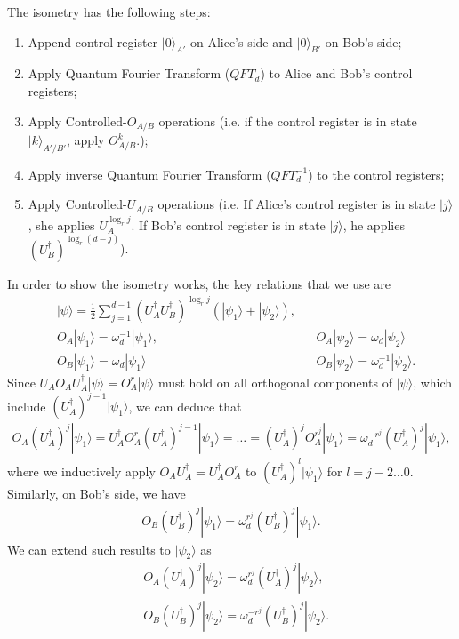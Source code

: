 \documentclass[11pt,letterpaper]{article}
\newcommand{\ket}[1]{|#1\rangle}
\newcommand{\ct}{^{\dagger}}
\newcommand{\1}{\mathbb{1}}
\theoremstyle{definition}
\begin{document}
The isometry has the following steps:
\begin{enumerate}
	\item Append control register $\ket{0}_{A'}$ on Alice's side and $\ket{0}_{B'}$ on Bob's side;
	\item Apply Quantum Fourier Transform ($QFT_d$) to Alice and Bob's control registers;
	\item Apply Controlled-$O_{A/B}$ operations (i.e. if the control register is in state $\ket{k}_{A'/ B'}$, apply
	$O_{A/B}^k$.);
	\item Apply inverse Quantum Fourier Transform ($QFT_d^{-1}$) to the control registers;
	\item Apply Controlled-$U_{A/B}$ operations (i.e. If Alice's control register is in state $\ket{j}$, she applies
	$U_A^{\log_r j}$. If Bob's control register is in state $\ket{j}$, he applies $(U_B\ct)^{\log_r (d-j)}$).
\end{enumerate}
In order to show the isometry works, the key relations that we use are
\begin{align}
	&\ket{\psi} = \frac{1}{2} \sum_{j=1}^{d-1} (U_A\ct U_B\ct)^{\log_r j} (\ket{\psi_1}+\ket{\psi_2}),&&\\
	&O_A \ket{\psi_1} = \omega_d^{-1} \ket{\psi_1},
	&&O_A\ket{\psi_2} = \omega_d \ket{\psi_2} \\
	&O_B\ket{\psi_1} = \omega_d \ket{\psi_1}
	&&O_B\ket{\psi_2} = \omega_d^{-1} \ket{\psi_2}.
\end{align}
Since $U_AO_AU_A\ct \ket{\psi} = O_A^r \ket{\psi}$ must hold on all orthogonal components 
of $\ket{\psi}$, which include $(U_A\ct)^{j-1} \ket{\psi_1}$, we can deduce that
\begin{align}
	O_A (U_A\ct)^j \ket{\psi_1} = U_A\ct O_A^r (U_A\ct)^{j-1} \ket{\psi_1} = \ldots = (U_A\ct)^j O_A^{r^j} \ket{\psi_1}
	= \omega_d^{-r^j} (U_A\ct)^j \ket{\psi_1},
\end{align}
where we inductively apply $O_AU_A\ct = U_A\ct O_A^r$ to $(U_A\ct)^l \ket{\psi_1}$ for $l = j-2 \dots 0$.
Similarly, on Bob's side, we have
\begin{align}
	O_B (U_B\ct)^j \ket{\psi_1} = \omega_d^{r^j} (U_B\ct)^j \ket{\psi_1}.
\end{align}
We can extend such results to $\ket{\psi_2}$ as 
\begin{align}
	&O_A (U_A\ct)^j \ket{\psi_2} = \omega_d^{r^j} (U_A\ct)^j \ket{\psi_2},\\
	&O_B (U_B\ct)^j \ket{\psi_2} = \omega_d^{-r^j} (U_B\ct)^j \ket{\psi_2}.
\end{align}
\end{document}
